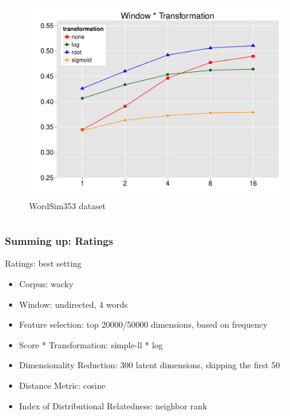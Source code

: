 \documentclass[t]{beamer} %
\begin{document}
\begin{frame}
\begin{columns}
\begin{column}{0.5\textwidth}
      \begin{figure}
        \hspace*{-18pt}   
        \includegraphics[scale=0.30]{img/lapesa_ws_main_window_transformation}
        \vspace{-10pt}
        \caption{WordSim353 dataset}
      \end{figure}
      
    \end{column}
  \end{columns}  
  
\end{frame}




\begin{frame}
  \frametitle{Summing up: Ratings}
  \begin{exampleblock}{Ratings: best setting}
    \begin{itemize}\footnotesize
    \item Corpus: wacky
    \item Window: undirected, 4 words 
    \item Feature selection: top 20000/50000 dimensions, based on frequency
    \item Score * Transformation: simple-ll * log
    \item Dimensionality Reduction: 300 latent dimensions, skipping the first 50
    \item Distance Metric: cosine
    \item Index of Distributional Relatedness: neighbor rank
    \end{itemize}
  \end{exampleblock}   
  
\end{frame}
\end{document}
